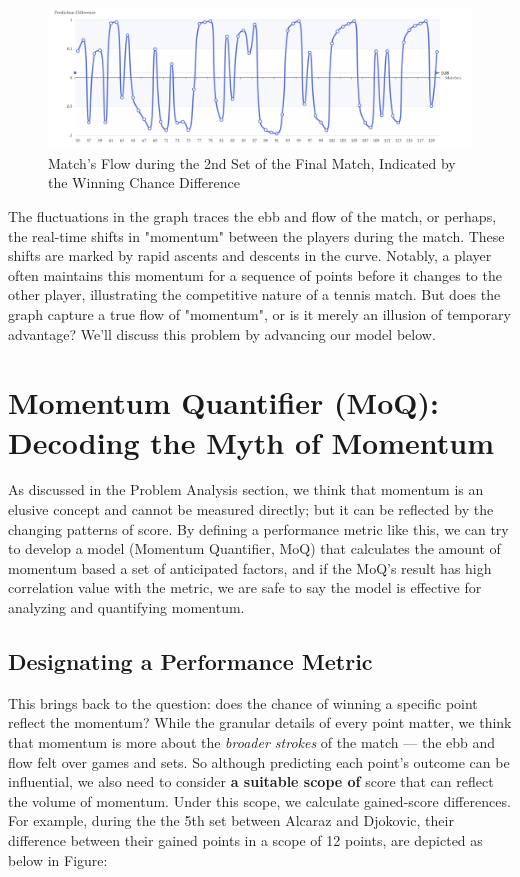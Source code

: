 \documentclass[12pt]{article}  %
\begin{document}
\begin{figure}[htbp]  %
	\centering  %
	\includegraphics[width=.8\textwidth]{prediction-difference.png} %
	\caption{Match's Flow during the 2nd Set of the Final Match, Indicated by the Winning Chance Difference} %
\end{figure}

The fluctuations in the graph traces the ebb and flow of the match, or perhaps, the real-time shifts in "momentum" between the players during the match. These shifts are marked by rapid ascents and descents in the curve. Notably, a player often maintains this momentum for a sequence of points before it changes to the other player, illustrating the competitive nature of a tennis match. But does the graph capture a true flow of "momentum", or is it merely an illusion of temporary advantage? We'll discuss this problem by advancing our model below.

\section{Momentum Quantifier (MoQ): Decoding the Myth of Momentum}

As discussed in the Problem Analysis section, we think that momentum is an elusive concept and cannot be measured directly; but it can be reflected by the changing patterns of score. By defining a performance metric like this, we can try to develop a model (Momentum Quantifier, MoQ) that calculates the amount of momentum based a set of anticipated factors, and if the MoQ's result has high correlation value with the metric, we are safe to say the model is effective for analyzing and quantifying momentum. 

\subsection{Designating a Performance Metric}
This brings back to the question: does the chance of winning a specific point reflect the momentum? While the granular details of every point matter, we think that momentum is more about the \textit{broader strokes} of the match — the ebb and flow felt over games and sets. So although predicting each point's outcome can be influential, we also need to consider \textbf{a suitable scope of} score that can reflect the volume of momentum. Under this scope, we calculate gained-score differences. For example, during the the 5th set between Alcaraz and Djokovic, their difference between their gained points in a scope of 12 points, are depicted as below in Figure: 
\end{document}
